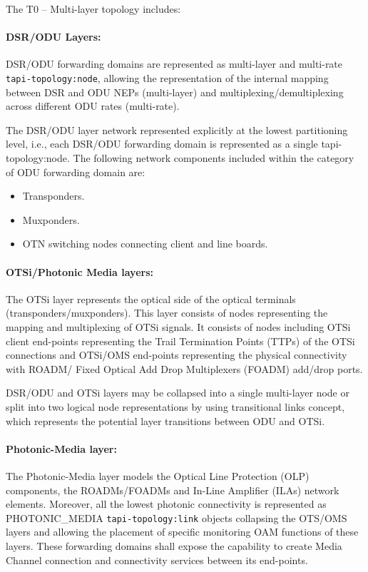 \documentclass[a4paper,fleqn]{cas-dc}
\begin{document}
The T0 – Multi-layer topology includes:

\paragraph{DSR/ODU Layers:}
DSR/ODU forwarding domains are represented as multi-layer and multi-rate \texttt{tapi-topology:node}, allowing the representation of the internal mapping between DSR and ODU NEPs (multi-layer) and multiplexing/demultiplexing across different ODU rates (multi-rate). 

The DSR/ODU layer network represented explicitly at the lowest partitioning level, i.e., each DSR/ODU forwarding domain is represented as a single tapi-topology:node. The following network components included within the category of ODU forwarding domain are:

\begin{itemize}
    \item Transponders.
    \item Muxponders.
    \item OTN switching nodes connecting client and line boards.
\end{itemize}

\paragraph{OTSi/Photonic Media layers:}
The OTSi layer represents the optical side of the optical terminals (transponders/muxponders). This layer consists of nodes representing the mapping and multiplexing of OTSi signals. It consists of nodes including OTSi client end-points representing the Trail Termination Points (TTPs) of the OTSi connections and OTSi/OMS end-points representing the physical connectivity with ROADM/ Fixed Optical Add Drop Multiplexers (FOADM) add/drop ports.

DSR/ODU and OTSi layers may be collapsed into a single multi-layer node or split into two logical node representations by using transitional links concept, which represents the potential layer transitions between ODU and OTSi.

\paragraph{Photonic-Media layer:}
The Photonic-Media layer models the Optical Line Protection (OLP) components, the ROADMs/FOADMs and In-Line Amplifier (ILAs) network elements. Moreover, all the lowest photonic connectivity is represented as PHOTONIC\_MEDIA \texttt{tapi-topology:link} objects collapsing the OTS/OMS layers and allowing the placement of specific monitoring OAM functions of these layers. These forwarding domains shall expose the capability to create Media Channel connection and connectivity services between its end-points.
\end{document}

